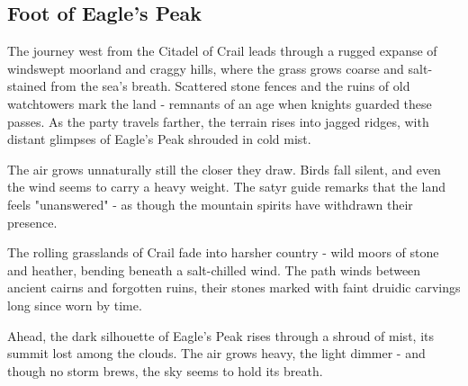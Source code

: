 \subsection*{Foot of Eagle's Peak}
{\entryfont The journey west from the Citadel of Crail leads through a rugged expanse of windswept moorland and craggy hills, where the grass grows coarse and salt-stained from the sea's breath. Scattered stone fences and the ruins of old watchtowers mark the land - remnants of an age when knights guarded these passes. As the party travels farther, the terrain rises into jagged ridges, with distant glimpses of Eagle's Peak shrouded in cold mist.

The air grows unnaturally still the closer they draw. Birds fall silent, and even the wind seems to carry a heavy weight. The satyr guide remarks that the land feels "unanswered" - as though the mountain spirits have withdrawn their presence.}
\begin{DndReadAloud}
	The rolling grasslands of Crail fade into harsher country - wild moors of stone and heather, bending beneath a salt-chilled wind. The path winds between ancient cairns and forgotten ruins, their stones marked with faint druidic carvings long since worn by time.

	Ahead, the dark silhouette of Eagle's Peak rises through a shroud of mist, its summit lost among the clouds. The air grows heavy, the light dimmer - and though no storm brews, the sky seems to hold its breath.
\end{DndReadAloud}
